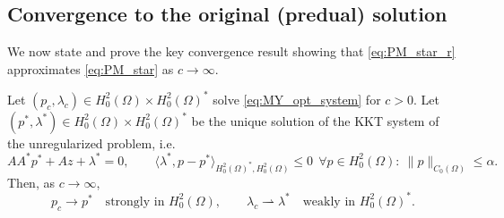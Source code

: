 \documentclass[11pt,a4paper]{article}
\begin{document}
\subsection*{Convergence to the original (predual) solution}

We now state and prove the key convergence result showing that \ref{eq:PM_star_r} approximates \eqref{eq:PM_star} as $c\to\infty$.

\begin{theorem}\label{thm:MY_convergence}
Let $(p_c,\lambda_c)\in H^2_0(\Omega)\times H^2_0(\Omega)^\ast$ solve \eqref{eq:MY_opt_system} for $c>0$.
Let $(p^\ast,\lambda^\ast)\in H^2_0(\Omega)\times H^2_0(\Omega)^\ast$ be the unique solution of the KKT system of the unregularized problem, i.e.
\[
AA^\ast p^\ast + Az + \lambda^\ast = 0,
\qquad
\langle \lambda^\ast, p-p^\ast\rangle_{H^2_0(\Omega)^\ast,H^2_0(\Omega)}\le 0
\ \ \forall p\in H^2_0(\Omega):\ \|p\|_{C_0(\Omega)}\le\alpha.
\]
Then, as $c\to\infty$,
\[
p_c \to p^\ast \quad\text{strongly in } H^2_0(\Omega),
\qquad
\lambda_c \rightharpoonup \lambda^\ast \quad\text{weakly in } H^2_0(\Omega)^\ast.
\]
\end{theorem}
\end{document}
